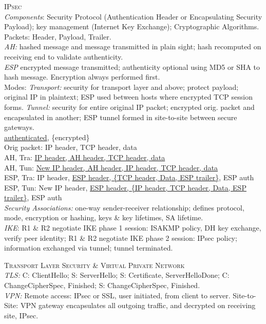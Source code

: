 \documentclass[a4paper, 9pt]{article}
\begin{document}
\textsc{IPsec}\\
\textit{Components}: Security Protocol (Authentication Header or Encapsulating Security Payload); key management (Internet Key Exchange); Cryptographic Algorithms.\\
Packets: Header, Payload, Trailer.\\
\textit{AH:} hashed message and message transmitted in plain sight; hash recomputed on receiving end to validate authenticity.\\
\textit{ESP} encrypted message transmitted; authenticity optional using MD5 or SHA to hash message. Encryption always performed first.\\
Modes: \textit{Transport:} security for transport layer and above; protect payload; original IP in plaintext; ESP used between hosts where encrypted TCP session forms. \textit{Tunnel:} security for entire original IP packet; encrypted orig. packet and encapsulated in another; ESP tunnel formed in site-to-site between secure gateways.\\
\underline{authenticated}, \{encrypted\}\\[0.2em]
Orig packet: IP header, TCP header, data\\[0.2em]
AH, Tra: \underline{IP header, AH header, TCP header, data}\\[0.2em]
AH, Tun: \underline{New IP header, AH header, IP header, TCP header, data}\\[0.2em]
ESP, Tra: IP header, \underline{ESP header, \{TCP header, Data, ESP trailer\}}, ESP auth\\[0.2em]
ESP, Tun: New IP header, \underline{ESP header, \{IP header, TCP header, Data, ESP trailer\}}, ESP auth\\[0.2em]
\textit{Security Associations:} one-way sender-receiver relationship; defines protocol, mode, encryption or hashing, keys \& key lifetimes, SA lifetime.\\
\textit{IKE}: R1 \& R2 negotiate IKE phase 1 session: ISAKMP policy, DH key exchange, verify peer identity; R1 \& R2 negotiate IKE phase 2 session: IPsec policy; information exchanged via tunnel; tunnel terminated.

\textsc{Transport Layer Security \& Virtual Private Network}\\
\textit{TLS:} C: ClientHello; S: ServerHello; S: Certificate, ServerHelloDone; C: ChangeCipherSpec, Finished; S: ChangeCipherSpec, Finished.\\
\textit{VPN:} Remote access: IPsec or SSL, user initiated, from client to server. Site-to-Site: VPN gateway encapsulates all outgoing traffic, and decrypted on receiving site, IPsec.
\end{document}
